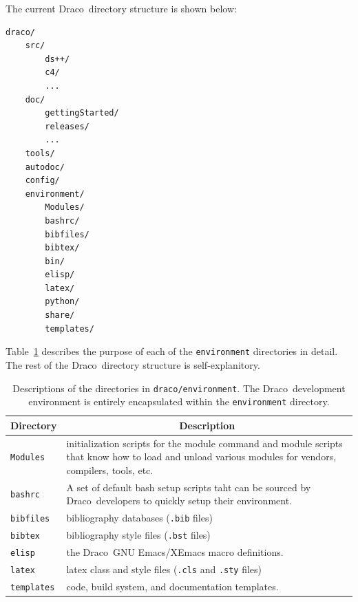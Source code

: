 \documentclass[note]{ResearchNote}
\newcommand{\draco}{Draco}
\newcommand{\tableText}[1]{{\raggedright #1}}
\begin{document}
The current \draco\ directory structure is shown below:
\begin{lstlisting}[basicstyle=\footnotesize, xleftmargin=2.0in, 
  xrightmargin=2.0in]
draco/
    src/
        ds++/
        c4/
        ...
    doc/
        gettingStarted/
        releases/
        ...
    tools/
    autodoc/
    config/
    environment/
        Modules/
        bashrc/
        bibfiles/
        bibtex/
        bin/
        elisp/
        latex/
        python/
        share/
        templates/
\end{lstlisting}
Table~\ref{tab:envdir} describes the purpose of each of the
\texttt{environment} directories in detail.  The rest of the
\draco\ directory structure is self-explanitory.
\begin{table}[!ht]
  \caption{
    Descriptions of the directories in \texttt{draco/environment}.
    The \draco\ development environment is entirely encapsulated
    within the \texttt{environment} directory.
  }
  \label{tab:envdir}
  \begin{center}
    \begin{tabular}{lp{3in}}\hline\hline
      \multicolumn{1}{c}{Directory} & 
      \multicolumn{1}{c}{Description} \\ \hline
      
      \texttt{Modules} & \tableText{initialization scripts for the
        module command and module scripts that know how to load and
        unload various modules for vendors, compilers, tools, etc.} \\
      
      \texttt{bashrc} & \tableText{A set of default bash setup scripts
        taht can be sourced by \draco\ developers to quickly setup
        their environment.} \\

      \texttt{bibfiles} & \tableText{bibliography databases
        (\texttt{.bib} files)} \\ 
      
      \texttt{bibtex} & \tableText{bibliography style files
        (\texttt{.bst} files)} \\
      
      \texttt{elisp} & \tableText{the \draco\ GNU Emacs/XEmacs macro
        definitions.} \\
      
      \texttt{latex} & \tableText{latex class and style files
        (\texttt{.cls} and \texttt{.sty} files)} \\ 

      \texttt{templates} & \tableText{code, build system, and
        documentation templates.} \\

      \hline\hline
    \end{tabular}
  \end{center}
\end{table}
\end{document}
